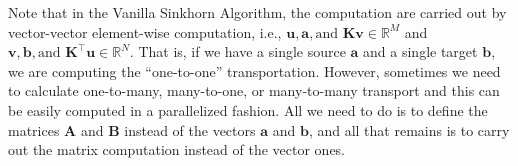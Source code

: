 Note that in the Vanilla Sinkhorn Algorithm, the computation are carried out by vector-vector element-wise computation,
i.e., $\mathbf{u}, \mathbf{a}, \text{and } \mathbf{K}\mathbf{v} \in \mathbb{R}^M$
and $\mathbf{v}, \mathbf{b}, \text{and } \mathbf{K}^\top \mathbf{u} \in \mathbb{R}^N$.
That is, if we have a single source $\mathbf{a}$ and a single target $\mathbf{b}$,
we are computing the ``one-to-one'' transportation.
However, sometimes we need to calculate one-to-many, many-to-one, or many-to-many transport
and this can be easily computed in a parallelized fashion.
All we need to do is to define the matrices $\mathbf{A}$ and $\mathbf{B}$ instead of the vectors $\mathbf{a}$ and $\mathbf{b}$,
and all that remains is to carry out the matrix computation instead of the vector ones.

